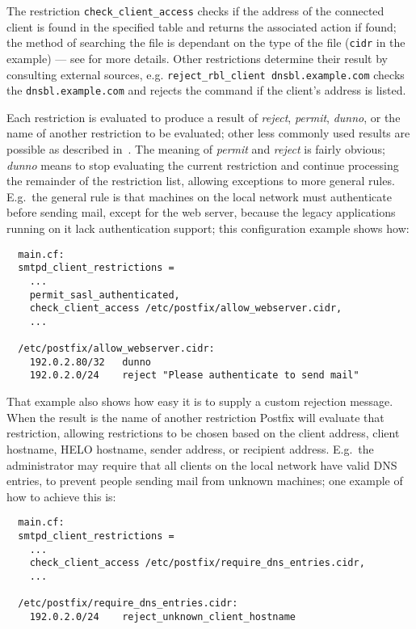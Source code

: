 The restriction \texttt{check\_client\_access} checks if the 
address of the connected client is found in the specified table and returns
the associated action if found; the method of searching the file is
dependant on the type of the file (\texttt{cidr} in the example) --- see
\cite{postfix-lookup-tables} for more details.  Other restrictions
determine their result by consulting external sources, e.g.\newline{}
\tab{}\texttt{reject\_rbl\_client dnsbl.example.com}\newline{} checks the
 \texttt{dnsbl.example.com} and rejects the command if the
client's  address is listed.

Each restriction is evaluated to produce a result of \textit{reject},
\textit{permit}, \textit{dunno}, or the name of another restriction to be
evaluated; other less commonly used results are possible as described
in~\cite{smtpd_access_readme,smtpd_per_user_control,policy-servers}. The
meaning of \textit{permit\/} and \textit{reject\/} is fairly obvious;
\textit{dunno\/} means to stop evaluating the current restriction and
continue processing the remainder of the restriction list, allowing
exceptions to more general rules.  E.g.\ the general rule is that machines
on the local network must authenticate before sending mail, except for the
web server, because the legacy applications running on it lack
authentication support; this configuration example shows how:

\begin{verbatim}
  main.cf:
  smtpd_client_restrictions =
    ...
    permit_sasl_authenticated,
    check_client_access /etc/postfix/allow_webserver.cidr,
    ...

  /etc/postfix/allow_webserver.cidr:
    192.0.2.80/32   dunno
    192.0.2.0/24    reject "Please authenticate to send mail"
\end{verbatim}

That example also shows how easy it is to supply a custom rejection
message.  When the result is the name of another restriction Postfix will
evaluate that restriction, allowing restrictions to be chosen based on the
client  address, client hostname, HELO hostname, sender
address, or recipient address.  E.g.\ the administrator may require that
all clients on the local network have valid DNS entries, to prevent people
sending mail from unknown machines; one example of how to achieve this is:

\begin{verbatim}
  main.cf:
  smtpd_client_restrictions =
    ...
    check_client_access /etc/postfix/require_dns_entries.cidr,
    ...

  /etc/postfix/require_dns_entries.cidr:
    192.0.2.0/24    reject_unknown_client_hostname
\end{verbatim}

